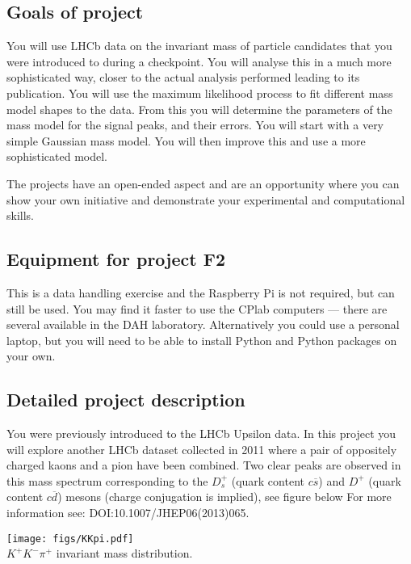 \subsection{Goals of project}

You will use LHCb data on the invariant mass of particle candidates that you were introduced to during a checkpoint.
You will analyse this in a much more sophisticated way, closer to the actual analysis performed leading to its publication.
You will use the maximum likelihood process to fit different mass model shapes to the data.
From this you will determine the parameters of the mass model for the signal peaks, and their errors.
You will start with a very simple Gaussian mass model.
You will then improve this and use a more sophisticated model.

The projects have an open-ended aspect and are an opportunity where you can show your own initiative and demonstrate your experimental and computational skills. 

\subsection{Equipment for project F2}

This is a data handling exercise and the Raspberry Pi is not required, but can still be used.
You may find it faster to use the CPlab computers --- there are several available in the DAH laboratory.
Alternatively you could use a personal laptop, but you will need to be able to install Python and Python packages on your own.

\subsection{Detailed project description}
 
You were previously introduced to the LHCb Upsilon data.
In this project you will explore another LHCb dataset collected in 2011 where a pair of oppositely charged kaons and a pion have been combined.
Two clear peaks are observed in this mass spectrum corresponding to the $D_s^+$ (quark content $c\overline{s}$) and $D^+$ (quark content $c\overline{d}$) mesons (charge conjugation is implied), see figure below %
For more information see: {DOI:10.1007/JHEP06(2013)065}.
%
\begin{center}
\texttt{[image: figs/KKpi.pdf]}\\
{\small $K^{+}K^{-}\pi^{+}$ invariant mass distribution.}
\end{center}
%

